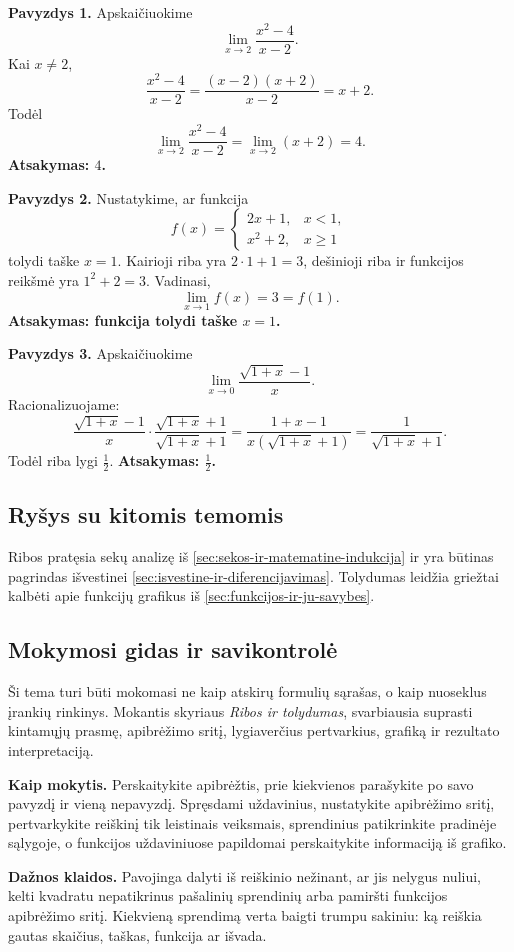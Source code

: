 \textbf{Pavyzdys 1.} Apskaičiuokime
\[
\lim_{x\to2}\frac{x^2-4}{x-2}.
\]
Kai $x\ne2$,
\[
\frac{x^2-4}{x-2}=\frac{(x-2)(x+2)}{x-2}=x+2.
\]
Todėl
\[
\lim_{x\to2}\frac{x^2-4}{x-2}=\lim_{x\to2}(x+2)=4.
\]
\textbf{Atsakymas: $4$.}

\textbf{Pavyzdys 2.} Nustatykime, ar funkcija
\[
f(x)=\begin{cases}2x+1,&x<1,\\ x^2+2,&x\ge1\end{cases}
\]
tolydi taške $x=1$. Kairioji riba yra $2\cdot1+1=3$, dešinioji riba ir funkcijos reikšmė yra $1^2+2=3$. Vadinasi,
\[
\lim_{x\to1}f(x)=3=f(1).
\]
\textbf{Atsakymas: funkcija tolydi taške $x=1$.}

\textbf{Pavyzdys 3.} Apskaičiuokime
\[
\lim_{x\to0}\frac{\sqrt{1+x}-1}{x}.
\]
Racionalizuojame:
\[
\frac{\sqrt{1+x}-1}{x}\cdot\frac{\sqrt{1+x}+1}{\sqrt{1+x}+1}
=\frac{1+x-1}{x(\sqrt{1+x}+1)}=\frac{1}{\sqrt{1+x}+1}.
\]
Todėl riba lygi $\frac12$. \textbf{Atsakymas: $\frac12$.}

\subsection{Ryšys su kitomis temomis}

Ribos pratęsia sekų analizę iš \ref{sec:sekos-ir-matematine-indukcija} ir yra būtinas pagrindas išvestinei \ref{sec:isvestine-ir-diferencijavimas}. Tolydumas leidžia griežtai kalbėti apie funkcijų grafikus iš \ref{sec:funkcijos-ir-ju-savybes}.

\subsection{Mokymosi gidas ir savikontrolė}

Ši tema turi būti mokomasi ne kaip atskirų formulių sąrašas, o kaip nuoseklus įrankių rinkinys. Mokantis skyriaus \textit{Ribos ir tolydumas}, svarbiausia suprasti kintamųjų prasmę, apibrėžimo sritį, lygiaverčius pertvarkius, grafiką ir rezultato interpretaciją.

\textbf{Kaip mokytis.} Perskaitykite apibrėžtis, prie kiekvienos parašykite po savo pavyzdį ir vieną nepavyzdį. Spręsdami uždavinius, nustatykite apibrėžimo sritį, pertvarkykite reiškinį tik leistinais veiksmais, sprendinius patikrinkite pradinėje sąlygoje, o funkcijos uždaviniuose papildomai perskaitykite informaciją iš grafiko.

\textbf{Dažnos klaidos.} Pavojinga dalyti iš reiškinio nežinant, ar jis nelygus nuliui, kelti kvadratu nepatikrinus pašalinių sprendinių arba pamiršti funkcijos apibrėžimo sritį. Kiekvieną sprendimą verta baigti trumpu sakiniu: ką reiškia gautas skaičius, taškas, funkcija ar išvada.

